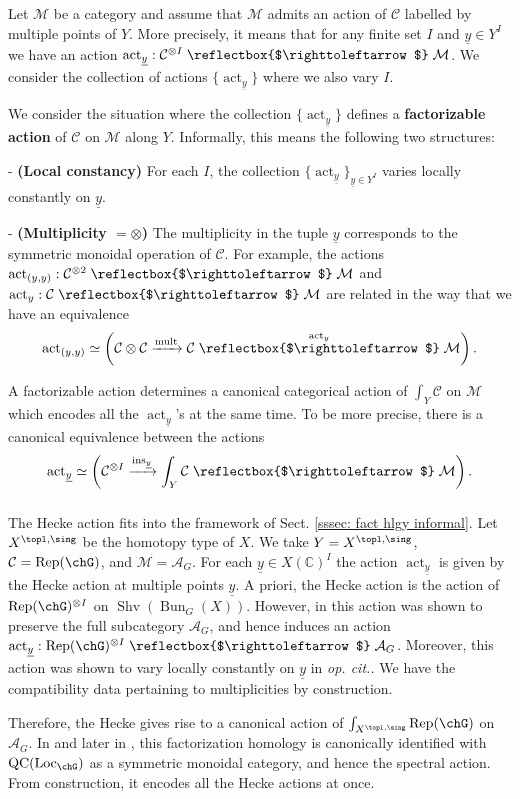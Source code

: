 \documentclass[10pt]{amsart}
\def\acts{\mathrel{\reflectbox{$\righttoleftarrow$}}}
\newcommand{\sssec}{\subsubsection}
\theoremstyle{remark}
\newcommand{\ul}{\underline}
\newcommand{\C}{\mathbb{C}}
\newcommand{\on}{\operatorname}
\newcommand{\cA}{\mathcal{A}}
\newcommand{\cC}{\mathcal{C}}
\newcommand{\cM}{\mathcal{M}}
\newcommand{\Rep}{\on{Rep}}
\newcommand{\QC}{\on{QC}}
\newcommand{\Shv}{\on{Shv}}
\newcommand{\Loc}{\on{Loc}}
\newcommand{\Bun}{\on{Bun}}
\begin{document}
Let $\cM$ be a category and assume that $\cM$ admits an action of $\cC$ labelled by multiple points of $Y$. More precisely, it means that for any finite set $I$ and $\ul{y}\in Y^I$ we have an action $\on{act}_{\ul{y}}:\cC^{\otimes I}\acts\cM$. We consider the collection of actions $\{\on{act}_{\ul{y}}\}$ where we also vary $I$. 
\medskip

We consider the situation where the collection $\{\on{act}_{\ul{y}}\}$ defines a \textbf{factorizable action} of $\cC$ on $\cM$ along $Y$. Informally, this means the following two structures:

- \textbf{(Local constancy)} For each $I$, the collection $\{\on{act}_{\ul{y}}\}_{\ul{y}\in Y^I}$ varies locally constantly on $\ul{y}$.

- \textbf{(Multiplicity $=\otimes$)} The multiplicity in the tuple $\ul{y}$ corresponds to the symmetric monoidal operation of $\cC$. For example, the actions $\on{act}_{(y,y)}:\cC^{\otimes 2}\acts \cM$ and $\on{act}_{y}:\cC\acts\cM$ are related in the way that we have an equivalence
\[\on{act}_{(y,y)}\simeq \left(\cC\otimes\cC\xrightarrow{\on{mult}}\cC\stackrel{\on{act}_y}{\acts} \cM\right).\]

A factorizable action determines a canonical categorical action of $\int_Y\cC$ on $\cM$ which encodes all the $\on{act}_{\ul{y}}$'s at the same time. To be more precise, there is a canonical equivalence between the actions
\[\on{act}_{\ul{y}}\simeq \left(\cC^{\otimes I}\xrightarrow{\on{ins}_{\ul{y}}}\int_Y\cC\acts \cM\right).\]

\sssec{}
The Hecke action fits into the framework of Sect. \ref{sssec: fact hlgy informal}. Let $X^{\topl,\sing}$ be the homotopy type of $X$. We take $Y=X^{\topl,\sing}$, $\cC=\Rep(\chG)$, and $\cM=\cA_G$. For each $\ul{y}\in X(\C)^I$ the action $\on{act}_{\ul{y}}$ is given by the Hecke action at multiple points $\ul{y}$. A priori, the Hecke action is the action of $\Rep(\chG)^{\otimes I}$ on $\Shv(\Bun_G(X))$. However, in \cite{NY} this action was shown to preserve the full subcategory $\cA_G$, and hence induces an action $\on{act}_{\ul{y}}: \Rep(\chG)^{\otimes I}\acts \cA_G$.
Moreover, this action was shown to vary locally constantly on $\ul{y}$ in \emph{op. cit..} We have the compatibility data pertaining to multiplicities by construction.
\medskip

Therefore, the Hecke gives rise to a canonical action of
$\int_{X^{\topl,\sing}}\Rep(\chG)$ on $\cA_G$. In \cite{BZFN} and later in \cite{GKRV}, this factorization homology is canonically identified with $\QC(\Loc_{\chG})$ as a symmetric monoidal category, and hence the spectral action. From construction, it encodes all the Hecke actions at once.
\end{document}
